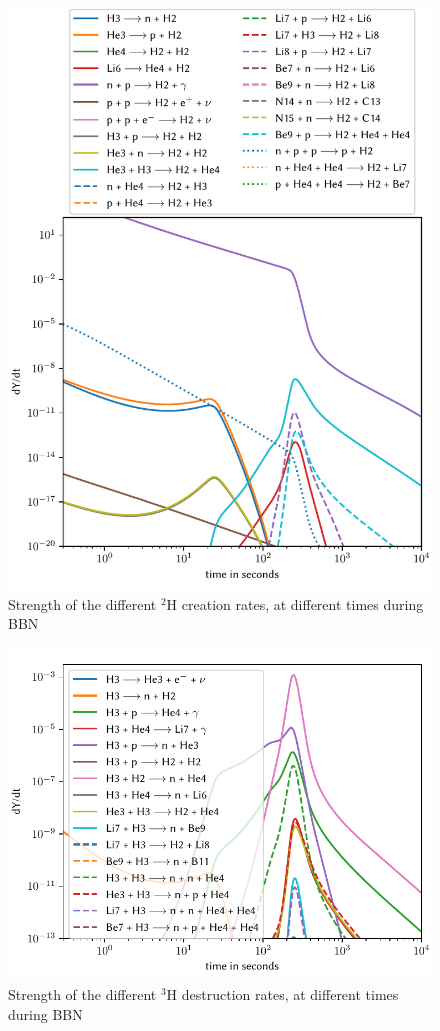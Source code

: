 \begin{figure}[ht]
    \includegraphics[width=5.1in]{figures/app/H2create.pdf}
    \caption{Strength of the different ${}^2$H creation rates, at different times during BBN}
    \label{fig:H2create}
\end{figure}

\begin{figure}[ht]
    \includegraphics[width=5.1in]{figures/app/H3destruct.pdf}
    \caption{Strength of the different ${}^3$H destruction rates, at different times during BBN}
    \label{fig:H3destruct}
\end{figure}


